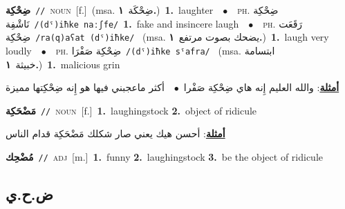 \documentclass[10pt,a4paper,twoside]{article} %
\begin{document}
\begin{multicols}{2}
{{{{{{\setlength\topsep{0pt}\textbf{\foreignlanguage{arabic}{ضِحْكِة}}\ {\color{gray}\texttt{//}\color{black}}\ \textsc{noun}\ [f.]\ \color{gray}(msa. \foreignlanguage{arabic}{ضِحْكَة}~\foreignlanguage{arabic}{\textbf{١.}})\color{black}\ \textbf{1.}~laughter\ \ $\bullet$\ \ \textsc{ph.} \color{gray} \foreignlanguage{arabic}{ضِحْكِة نَاشْفِة}\color{black}\ {\color{gray}\texttt{/{\sffamily (dˤ)iħke naːʃfe}/}\color{black}}\ \textbf{1.}~fake and insincere laugh\ \ $\bullet$\ \ \textsc{ph.} \color{gray} \foreignlanguage{arabic}{رَقَعَت ضِحْكِة}\color{black}\ {\color{gray}\texttt{/{\sffamily ra(q)aʕat (dˤ)iħke}/}\color{black}}\ \color{gray} (msa. \foreignlanguage{arabic}{يضحك بصوت مرتفع}~\foreignlanguage{arabic}{\textbf{١.}})\color{black}\ \textbf{1.}~laugh very loudly\ \ $\bullet$\ \ \textsc{ph.} \color{gray} \foreignlanguage{arabic}{ضِحْكِة صَفْرَا}\color{black}\ {\color{gray}\texttt{/{\sffamily (dˤ)iħke sˤafra}/}\color{black}}\ \color{gray} (msa. \foreignlanguage{arabic}{ابتسامة خبيثة}~\foreignlanguage{arabic}{\textbf{١.}})\color{black}\ \textbf{1.}~malicious grin\  \begin{flushright}\color{gray}\foreignlanguage{arabic}{\textbf{\underline{\foreignlanguage{arabic}{أمثلة}}}: والله العليم إِنه هاي ضِحْكِة صَفْرا\ $\bullet$\ \  أكثر ماعجبني فيها هو إِنه ضِحْكِتها مميزة}\end{flushright}\color{black}} \vspace{2mm}

{\setlength\topsep{0pt}\textbf{\foreignlanguage{arabic}{مَضْحَكِة}}\ {\color{gray}\texttt{//}\color{black}}\ \textsc{noun}\ [f.]\ \textbf{1.}~laughingstock  \textbf{2.}~object of ridicule\  \begin{flushright}\color{gray}\foreignlanguage{arabic}{\textbf{\underline{\foreignlanguage{arabic}{أمثلة}}}: أحسن هيك يعني صار شكلك مَضْحَكِة قدام الناس}\end{flushright}\color{black}} \vspace{2mm}

{\setlength\topsep{0pt}\textbf{\foreignlanguage{arabic}{مُضْحِك}}\ {\color{gray}\texttt{//}\color{black}}\ \textsc{adj}\ [m.]\ \textbf{1.}~funny  \textbf{2.}~laughingstock  \textbf{3.}~be the object of ridicule\ 

\vspace{-3mm}
\subsection*{\color{blue}\foreignlanguage{arabic}{ض.ح.ي}\color{blue}{}} 

}}}}}}
\end{multicols}
\end{document}
